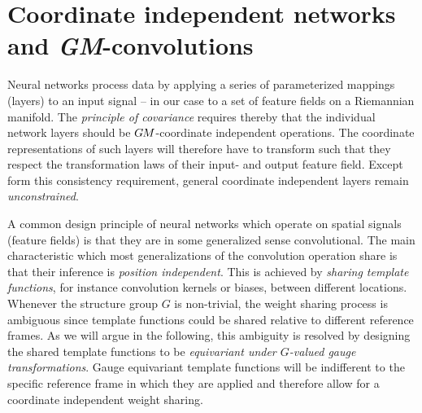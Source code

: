 

\section{Coordinate independent networks and \textit{GM}-convolutions}
\label{sec:gauge_CNNs_local}


Neural networks process data by applying a series of parameterized mappings (layers) to an input signal -- in our case to a set of feature fields on a Riemannian manifold.
The \emph{principle of covariance} requires thereby that the individual network layers should be $G\mkern-1.4muM$-coordinate independent operations.
The coordinate representations of such layers will therefore have to transform such that they respect the transformation laws of their input- and output feature field.
Except form this consistency requirement, general coordinate independent layers remain \emph{unconstrained}.


A common design principle of neural networks which operate on spatial signals (feature fields) is that they are in some generalized sense convolutional.
The main characteristic which most generalizations of the convolution operation share is that their inference is \emph{position independent}.
This is achieved by \emph{sharing template functions}, for instance convolution kernels or biases, between different locations.
Whenever the structure group $G$ is non-trivial, the weight sharing process is ambiguous since template functions could be shared relative to different reference frames.
As we will argue in the following, this ambiguity is resolved by designing the shared template functions to be \emph{equivariant under $G$-valued gauge transformations}.
Gauge equivariant template functions will be indifferent to the specific reference frame in which they are applied and therefore allow for a coordinate independent weight sharing.



\etocsettocstyle{}{} %
\localtableofcontents




